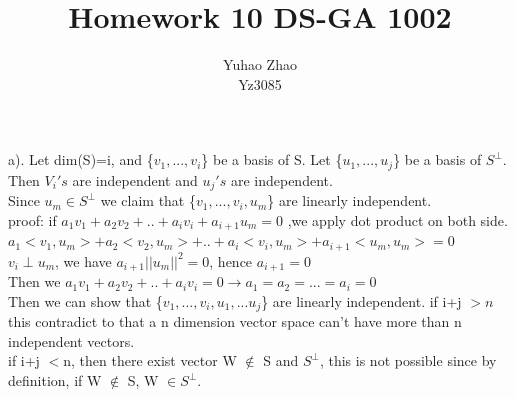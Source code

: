 \documentclass[11pt]{article}
\newenvironment{problem}[2][Problem]{\begin{trivlist}
\item[\hskip \labelsep {\bfseries #1}\hskip \labelsep {\bfseries #2.}]}{\end{trivlist}}
\begin{document}
 
 
\title{Homework 10 DS-GA 1002 }%
\author{Yuhao Zhao\\ %
Yz3085} %
 
\maketitle
\begin{problem}{1}
\end{problem}
a). Let dim(S)=i, and \{$v_1,...,v_i$\} be  a basis of S. Let \{$u_1,...,u_j$\}  be a basis of $S^\perp$.\\
Then $V_i's$ are independent and $u_j's$ are independent.\\
Since $u_m \in S^\perp$ we claim that \{$v_1,...,v_i,u_m$\} are linearly independent.\\

proof:  if $a_1 v_1 + a_2 v_2 + .. +a_i v_i + a_{i+1} u_m = 0$ ,we apply dot product on both side.\\
$a_1 <v_1,u_m> + a_2 <v_2,u_m> + .. +a_i <v_i,u_m> + a_{i+1} <u_m,u_m> = 0$\\
$v_i \perp u_m$, we have $a_{i+1} ||u_m||^2 =0$, hence $a_{i+1} = 0$\\
Then we $a_1 v_1 + a_2 v_2 + .. +a_i v_i  = 0  \to a_1  =a_2 =... = a_i = 0$ \\

Then we can show that \{$v_1,...,v_i,u_1,...u_j$\} are linearly independent. if  i+j $>n$ this contradict to that a n dimension vector space can't have more than n independent vectors. \\
if i+j $<$n, then there exist vector W $\notin $ S and $S^\perp$, this is not possible since by definition, if W $\notin$ S, W $\in S^\perp$. \\
\end{document}

